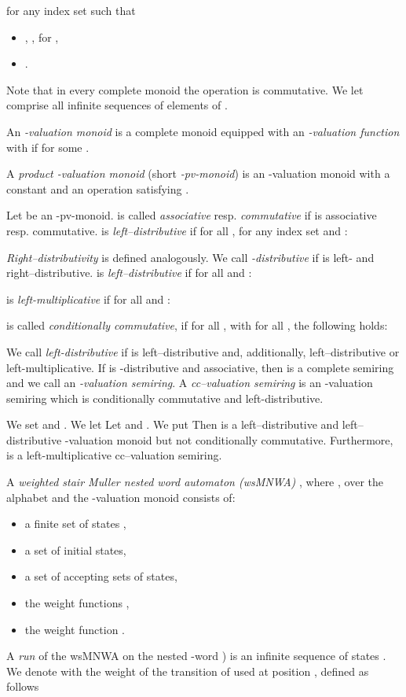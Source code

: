 \documentclass[runningheads, envcountsame, a4paper]{llncs}
\begin{document}
	for any index set  such that
	\begin{itemize}
		\item ,
		 ,
		  for ,
		\item .
	\end{itemize}
	Note that in every complete monoid the operation  is commutative.
We let  comprise all infinite sequences of elements of .
\begin{Def}
	An \emph{-valuation monoid}  is a complete monoid  equipped with an \emph{-valuation function}
 with  if  for some .\par
	A \emph{product -valuation monoid}  (short \emph{-pv-monoid}) is an -valuation monoid  with a constant  and an operation  satisfying .
\end{Def}
Let  be an -pv-monoid.  is called \emph{associative} resp. \emph{commutative} if  is associative resp. commutative. 
	 is \emph{left--distributive} if for all , for any index set  and :
		
	\emph{Right--distributivity} is defined analogously. We call  \emph{-distributive} if  is left- and right--distributive. 
 is \emph{left--distributive} if for all  and :
		
 is \emph{left-multiplicative} if for all  and :
		
 is called \emph{conditionally commutative}, if for all ,  with  for all , the following holds:

	We call  \emph{left-distributive} if  is left--distributive and, additionally, left--distributive or left-multiplicative. 
	If  is -distributive and associative, then  is a complete semiring and we call  an \emph{-valuation semiring}. 
	A \emph{cc--valuation semiring} is an -valuation semiring  which is conditionally commutative and left-distributive.
\begin{example}[\cite{DM}] We set  and . We let 
Let  and . We put 
Then  is a left--distributive and left--distributive -valuation monoid but not conditionally commutative. Furthermore,  is a left-multiplicative cc--valuation semiring. 
\end{example}
\begin{Def} \label{defwsMNWA}
	A \emph{weighted stair Muller nested word automaton (wsMNWA)} , where , over the alphabet  and the -valuation monoid  consists of:
	\begin{itemize}
		\item a finite set of states ,
		\item a set  of initial states,
		\item a set  of accepting sets of states,
		\item the weight functions ,
 		\item the weight function .
	\end{itemize}
\end{Def}
A \emph{run}  of the wsMNWA  on the nested -word ) is an infinite sequence of states . We denote with  the weight of the transition of  used at position , defined as follows
\end{document}
